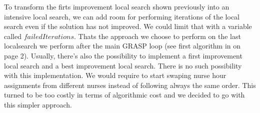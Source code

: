 To transform the firts improvement local search shown previously into an intensive local search,  we can add room for performing iterations of the local search even if the solution has not improved. We could limit that with a variable called $failedIterations$. Thats the approach we choose to perform on the last localsearch we perform after the main GRASP loop (see first algorithm in \cite{grasp} on page 2).
Usually, there's also the possibility to implement a first improvement local search and a best improvement local search. There is no such possibility with this implementation. We would require to start swaping nurse hour assignments from different nurses instead of following always the same order. This turned to be too costly in terms of algorithmic cost and we decided to go with this simpler approach.



